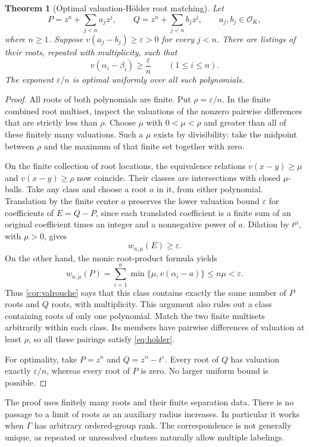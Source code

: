 \documentclass[11pt,letterpaper]{article}
\numberwithin{equation}{section}
\newtheorem{theorem}{Theorem}[section]
\theoremstyle{definition}
\theoremstyle{remark}\newtheorem{remark}[theorem]{Remark}
\newcommand{\OO}{\mathcal O}
\begin{document}
\begin{theorem}[Optimal valuation-H\"older root matching]\label{thm:holder}
Let
\[
 P=z^n+\sum_{j<n}a_jz^j,\qquad
 Q=z^n+\sum_{j<n}b_jz^j,\qquad a_j,b_j\in\OO_K,
\]
where $n\ge1$. Suppose $v(a_j-b_j)\ge\varepsilon>0$ for every $j<n$.
There are listings of their roots, repeated with multiplicity, such that
\begin{equation}\label{eq:holder}
 \boxed{\displaystyle v(\alpha_i-\beta_i)\ge\frac{\varepsilon}{n}
 \qquad(1\le i\le n).}
\end{equation}
The exponent $\varepsilon/n$ is optimal uniformly over all such
polynomials.
\end{theorem}
\begin{proof}
All roots of both polynomials are finite. Put $\rho=\varepsilon/n$.
In the finite combined root multiset, inspect the valuations of the
nonzero pairwise differences that are strictly less than $\rho$.
Choose $\mu$ with $0<\mu<\rho$ and greater than all of these finitely
many valuations. Such a $\mu$ exists by divisibility: take the midpoint
between $\rho$ and the maximum of that finite set together with zero.

On the finite collection of root locations, the equivalence relations
$v(x-y)\ge\mu$ and $v(x-y)\ge\rho$ now coincide. Their classes are
intersections with closed $\mu$-balls. Take any class and choose a
root $a$ in it, from either polynomial. Translation by the finite
center $a$ preserves the lower valuation bound $\varepsilon$ for
coefficients of $E=Q-P$, since each translated coefficient is a finite
sum of an original coefficient times an integer and a nonnegative
power of $a$. Dilation by $t^\mu$, with $\mu>0$, gives
\[
 w_{a,\mu}(E)\ge\varepsilon.
\]
On the other hand, the monic root-product formula yields
\[
 w_{a,\mu}(P)=\sum_{i=1}^n\min\{\mu,v(\alpha_i-a)\}
 \le n\mu<\varepsilon.
\]
Thus \cref{cor:valrouche} says that this class contains exactly the
same number of $P$ roots and $Q$ roots, with multiplicity. This
argument also rules out a class containing roots of only one polynomial.
Match the two finite multisets arbitrarily within each class. Its
members have pairwise differences of valuation at least $\rho$, so
all these pairings satisfy \eqref{eq:holder}.

For optimality, take $P=z^n$ and $Q=z^n-t^\varepsilon$. Every root of
$Q$ has valuation exactly $\varepsilon/n$, whereas every root of $P$
is zero. No larger uniform bound is possible.
\end{proof}
The proof uses finitely many roots and their finite separation data.
There is no passage to a limit of roots as an auxiliary radius increases.
In particular it works when $\Gamma$ has arbitrary ordered-group rank.
The correspondence is not generally unique, as repeated or unresolved
clusters naturally allow multiple labelings.
\end{document}

